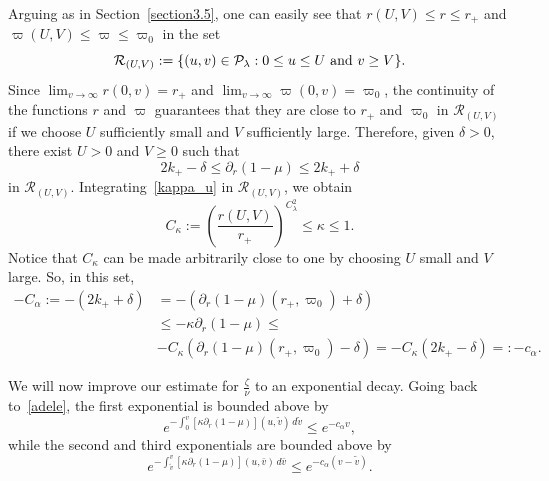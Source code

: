 \documentclass[a4paper,11pt,oneside,reqno]{amsart}
\newcommand{\kk}{k_+}
\newcommand{\cal}{\mathcal}
\newcommand{\ruv}{{\cal R}_{(U,V)}}
\begin{document}
Arguing as in Section~\ref{section3.5}, one can easily see that $r(U,V)\leq r\leq r_+$ and $\varpi(U,V)\leq\varpi\leq\varpi_0$ in the set 
$$
\ruv:=\{(u,v)\in {\cal P}_\lambda:0\leq u\leq U\ {\rm and}\ v\geq V\}.
$$
Since $\lim_{v\to\infty}r(0,v)=r_+$ and $\lim_{v\to\infty}\varpi(0,v)=\varpi_0$, the continuity of the functions $r$ and $\varpi$ guarantees that they are close to $r_+$ and $\varpi_0$ in $\ruv$ if we choose $U$ sufficiently small and $V$ sufficiently large. Therefore, given $\delta>0$, there exist $U>0$ and $V\geq 0$ such that
$$
2\kk-\delta\leq
\partial_r(1-\mu)\leq 2\kk+\delta
$$
in $\ruv$.
Integrating~\eqref{kappa_u} in $\ruv$, we obtain
\begin{equation}\label{c_k}
C_\kappa:=\left(\frac{r(U,V)}{r_+}\right)^{C_\lambda^2}\leq\kappa\leq 1.
\end{equation}
Notice that $C_\kappa$ can be made arbitrarily close to one by choosing $U$ small and $V$ large.
So, in this set,
\begin{align}
-C_\alpha:=-(2\kk +\delta)&=-(\partial_r(1-\mu)(r_+,\varpi_0)+\delta)\nonumber\\
&\leq-\kappa\partial_r(1-\mu)\leq\label{c-alpha}\\
&-C_\kappa(\partial_r(1-\mu)(r_+,\varpi_0)-\delta)=-C_\kappa(2\kk -\delta)=:-c_\alpha.\nonumber
\end{align}

We will now improve our estimate for $\frac{\zeta}{\nu}$ to an exponential decay. Going back to~\eqref{adele}, the first exponential is bounded above by
$$
e^{-\int_0^v[\kappa\partial_r(1-\mu)](u,\tilde v)\,d\tilde v}\leq
e^{-c_\alpha v},
$$
while the second and third exponentials are bounded above by
$$
e^{-\int_{\tilde v}^v[\kappa\partial_r(1-\mu)](u,\bar v)\,d\bar v}\leq
e^{-c_\alpha(v-\tilde v)}.
$$
\end{document}
